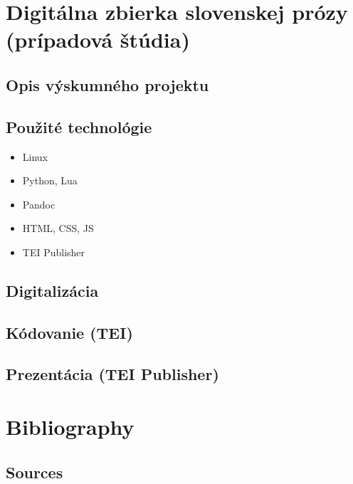 \documentclass[
  titlepage,
  openright,
  DIV=calc,
  toc=listof,
  listof=nochaptergap]{scrbook}
\providecommand{\tightlist}{%
  \setlength{\itemsep}{0pt}\setlength{\parskip}{0pt}}
\begin{document}
\chapter{Digitálna zbierka slovenskej prózy (prípadová
štúdia)}\label{sec:dispro}

\section{Opis výskumného projektu}\label{opis-vuxfdskumnuxe9ho-projektu}

\section{Použité technológie}\label{pouux17eituxe9-technoluxf3gie}

\begin{itemize}
\tightlist
\item
  Linux
\item
  Python, Lua
\item
  Pandoc
\item
  HTML, CSS, JS
\item
  TEI Publisher
\end{itemize}

\section{Digitalizácia}\label{digitalizuxe1cia}

\section{Kódovanie (TEI)}\label{kuxf3dovanie-tei}

\section{Prezentácia (TEI
Publisher)}\label{prezentuxe1cia-tei-publisher}


\listoffigures

\chapter{Bibliography}\label{bibliography}

\section{Sources}\label{sources}
\end{document}
